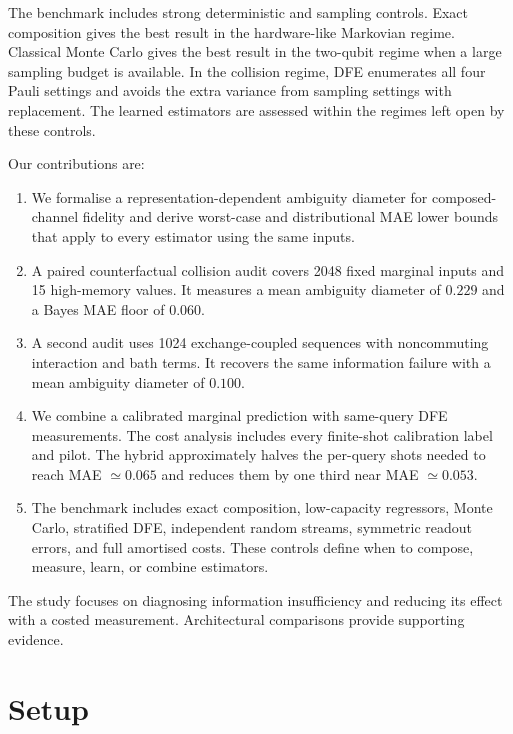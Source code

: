 \documentclass[12pt]{iopart}
\begin{document}
The benchmark includes strong deterministic and sampling controls. Exact composition gives the best result in the hardware-like Markovian regime. Classical Monte Carlo gives the best result in the two-qubit regime when a large sampling budget is available. In the collision regime, DFE enumerates all four Pauli settings and avoids the extra variance from sampling settings with replacement. The learned estimators are assessed within the regimes left open by these controls.

Our contributions are:
\begin{enumerate}[label=(\alph*),itemsep=2pt,topsep=2pt]
\item We formalise a representation-dependent ambiguity diameter for composed-channel fidelity and derive worst-case and distributional MAE lower bounds that apply to every estimator using the same inputs.
\item A paired counterfactual collision audit covers 2048 fixed marginal inputs and 15 high-memory values. It measures a mean ambiguity diameter of $0.229$ and a Bayes MAE floor of $0.060$.
\item A second audit uses 1024 exchange-coupled sequences with noncommuting interaction and bath terms. It recovers the same information failure with a mean ambiguity diameter of $0.100$.
\item We combine a calibrated marginal prediction with same-query DFE measurements. The cost analysis includes every finite-shot calibration label and pilot. The hybrid approximately halves the per-query shots needed to reach MAE $\simeq0.065$ and reduces them by one third near MAE $\simeq0.053$.
\item The benchmark includes exact composition, low-capacity regressors, Monte Carlo, stratified DFE, independent random streams, symmetric readout errors, and full amortised costs. These controls define when to compose, measure, learn, or combine estimators.
\end{enumerate}
The study focuses on diagnosing information insufficiency and reducing its effect with a costed measurement. Architectural comparisons provide supporting evidence.



\section{Setup}
\label{sec:setup}
\end{document}
